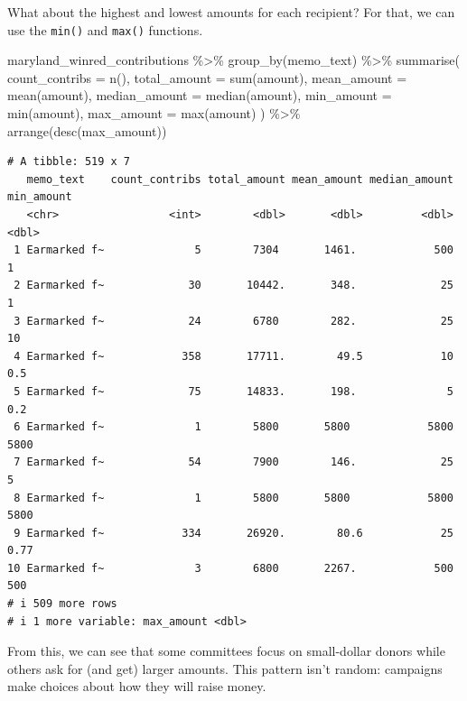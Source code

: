 \documentclass[
  letterpaper,
  DIV=11,
  numbers=noendperiod]{scrreprt}
\newenvironment{Shaded}{\begin{snugshade}}{\end{snugshade}}
\newcommand{\AttributeTok}[1]{\textcolor[rgb]{0.40,0.45,0.13}{#1}}
\newcommand{\FunctionTok}[1]{\textcolor[rgb]{0.28,0.35,0.67}{#1}}
\newcommand{\NormalTok}[1]{\textcolor[rgb]{0.00,0.23,0.31}{#1}}
\newcommand{\SpecialCharTok}[1]{\textcolor[rgb]{0.37,0.37,0.37}{#1}}
\begin{document}
What about the highest and lowest amounts for each recipient? For that,
we can use the \texttt{min()} and \texttt{max()} functions.

\begin{Shaded}
\begin{Highlighting}[]
\NormalTok{maryland\_winred\_contributions }\SpecialCharTok{\%\textgreater{}\%}
  \FunctionTok{group\_by}\NormalTok{(memo\_text) }\SpecialCharTok{\%\textgreater{}\%}
  \FunctionTok{summarise}\NormalTok{(}
    \AttributeTok{count\_contribs =} \FunctionTok{n}\NormalTok{(),}
    \AttributeTok{total\_amount =} \FunctionTok{sum}\NormalTok{(amount),}
    \AttributeTok{mean\_amount =} \FunctionTok{mean}\NormalTok{(amount),}
    \AttributeTok{median\_amount =} \FunctionTok{median}\NormalTok{(amount),}
    \AttributeTok{min\_amount =} \FunctionTok{min}\NormalTok{(amount),}
    \AttributeTok{max\_amount =} \FunctionTok{max}\NormalTok{(amount)}
\NormalTok{  ) }\SpecialCharTok{\%\textgreater{}\%}
  \FunctionTok{arrange}\NormalTok{(}\FunctionTok{desc}\NormalTok{(max\_amount))}
\end{Highlighting}
\end{Shaded}

\begin{verbatim}
# A tibble: 519 x 7
   memo_text    count_contribs total_amount mean_amount median_amount min_amount
   <chr>                 <int>        <dbl>       <dbl>         <dbl>      <dbl>
 1 Earmarked f~              5        7304       1461.            500       1   
 2 Earmarked f~             30       10442.       348.             25       1   
 3 Earmarked f~             24        6780        282.             25      10   
 4 Earmarked f~            358       17711.        49.5            10       0.5 
 5 Earmarked f~             75       14833.       198.              5       0.2 
 6 Earmarked f~              1        5800       5800            5800    5800   
 7 Earmarked f~             54        7900        146.             25       5   
 8 Earmarked f~              1        5800       5800            5800    5800   
 9 Earmarked f~            334       26920.        80.6            25       0.77
10 Earmarked f~              3        6800       2267.            500     500   
# i 509 more rows
# i 1 more variable: max_amount <dbl>
\end{verbatim}

From this, we can see that some committees focus on small-dollar donors
while others ask for (and get) larger amounts. This pattern isn't
random: campaigns make choices about how they will raise money.
\end{document}
